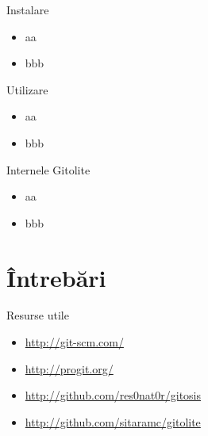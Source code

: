 \documentclass{simple}
\begin{document}
\begin{frame}{Instalare}
	\begin{itemize}
		\item aa
		\item bbb
	\end{itemize}
\end{frame}

\begin{frame}{Utilizare}
	\begin{itemize}
		\item aa
		\item bbb
	\end{itemize}
\end{frame}

\begin{frame}{Internele Gitolite}
	\begin{itemize}
		\item aa
		\item bbb
	\end{itemize}
\end{frame}

\section{Întrebări}

\begin{frame}{Resurse utile}
	\begin{itemize}
		\item \url{http://git-scm.com/}
		\item \url{http://progit.org/}
		\item \url{http://github.com/res0nat0r/gitosis}
		\item \url{http://github.com/sitaramc/gitolite}
	\end{itemize}
\end{frame}

\frame{\tableofcontents[currentsection]}
\end{document}
